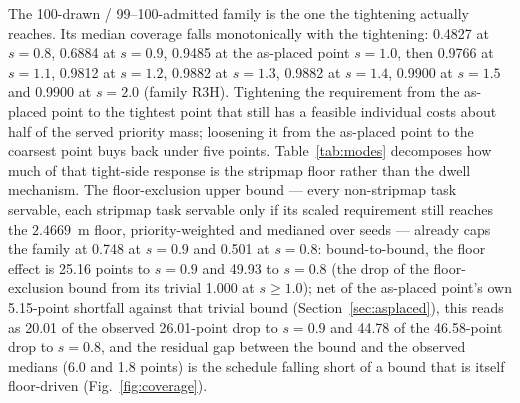 \documentclass[preprint,authoryear]{elsarticle}
\begin{document}
The 100-drawn / 99--100-admitted family is the one the tightening actually reaches. Its median coverage falls monotonically with the tightening: 0.4827 at $s=0.8$, 0.6884 at $s=0.9$, 0.9485 at the as-placed point $s=1.0$, then 0.9766 at $s=1.1$, 0.9812 at $s=1.2$, 0.9882 at $s=1.3$, 0.9882 at $s=1.4$, 0.9900 at $s=1.5$ and 0.9900 at $s=2.0$ (family R3H). Tightening the requirement from the as-placed point to the tightest point that still has a feasible individual costs about half of the served priority mass; loosening it from the as-placed point to the coarsest point buys back under five points. Table~\ref{tab:modes} decomposes how much of that tight-side response is the stripmap floor rather than the dwell mechanism. The floor-exclusion upper bound --- every non-stripmap task servable, each stripmap task servable only if its scaled requirement still reaches the $2.4669$~m floor, priority-weighted and medianed over seeds --- already caps the family at 0.748 at $s=0.9$ and 0.501 at $s=0.8$: bound-to-bound, the floor effect is 25.16 points to $s=0.9$ and 49.93 to $s=0.8$ (the drop of the floor-exclusion bound from its trivial 1.000 at $s\ge1.0$); net of the as-placed point's own 5.15-point shortfall against that trivial bound (Section~\ref{sec:asplaced}), this reads as 20.01 of the observed 26.01-point drop to $s=0.9$ and 44.78 of the 46.58-point drop to $s=0.8$, and the residual gap between the bound and the observed medians (6.0 and 1.8 points) is the schedule falling short of a bound that is itself floor-driven (Fig.~\ref{fig:coverage}).
\end{document}
